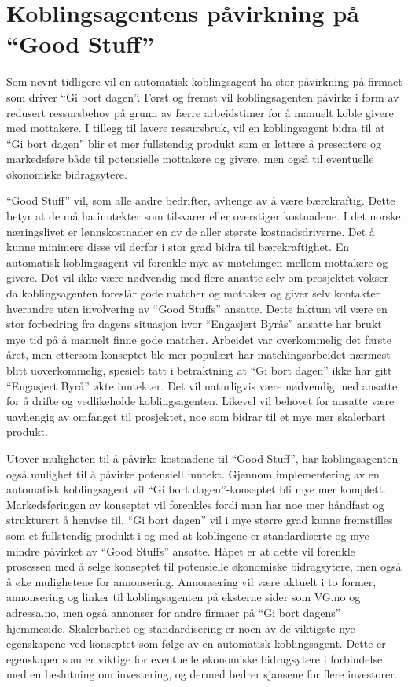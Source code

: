 \section{Koblingsagentens påvirkning på ``Good Stuff''}
\label{sec:koblingsagent}
Som nevnt tidligere vil en automatisk koblingsagent ha stor påvirkning på firmaet som driver ``Gi bort dagen''. Først og fremst vil koblingsagenten påvirke i form av redusert ressursbehov på grunn av færre arbeidstimer for å manuelt koble givere med mottakere. I tillegg til lavere ressursbruk, vil en koblingsagent bidra til at ``Gi bort dagen'' blir et mer fullstendig produkt som er lettere å presentere og markedsføre både til potensielle mottakere og givere, men også til eventuelle økonomiske bidragsytere.

``Good Stuff'' vil, som alle andre bedrifter, avhenge av å være bærekraftig. Dette betyr at de må ha inntekter som tilsvarer eller overstiger kostnadene. I det norske næringslivet er lønnskostnader en av de aller største kostnadsdriverne. Det å kunne minimere disse vil derfor i stor grad bidra til bærekraftighet. En automatisk koblingsagent vil forenkle mye av matchingen mellom mottakere og givere. Det vil ikke være nødvendig med flere ansatte selv om prosjektet vokser da koblingsagenten foreslår gode matcher og mottaker og giver selv kontakter hverandre uten involvering av ``Good Stuffs'' ansatte. Dette faktum vil være en stor forbedring fra dagens situasjon hvor ``Engasjert Byrås'' ansatte har brukt mye tid på å manuelt finne gode matcher. Arbeidet var overkommelig det første året, men ettersom konseptet ble mer populært har matchingsarbeidet nærmest blitt uoverkommelig, spesielt tatt i betraktning at ``Gi bort dagen'' ikke har gitt ``Engasjert Byrå'' økte inntekter. Det vil naturligvis være nødvendig med ansatte for å drifte og vedlikeholde koblingsagenten. Likevel vil behovet for ansatte være uavhengig av omfanget til prosjektet, noe som bidrar til et mye mer skalerbart produkt.

Utover muligheten til å påvirke kostnadene til ``Good Stuff'', har koblingsagenten også mulighet til å påvirke potensiell inntekt. Gjennom implementering av en automatisk koblingsagent vil “Gi bort dagen”-konseptet bli mye mer komplett. Markedsføringen av konseptet vil forenkles fordi man har noe mer håndfast og strukturert å henvise til. ``Gi bort dagen'' vil i mye større grad kunne fremstilles som et fullstendig produkt i og med at koblingene er standardiserte og mye mindre påvirket av ``Good Stuffs'' ansatte. Håpet er at dette vil forenkle prosessen med å selge konseptet til potensielle økonomiske bidragsytere, men også å øke mulighetene for annonsering. Annonsering vil være aktuelt i to former, annonsering og linker til koblingsagenten på eksterne sider som VG.no og adressa.no, men også annonser for andre firmaer på ``Gi bort dagens'' hjemmeside. Skalerbarhet og standardisering er noen av de viktigste nye egenskapene ved konseptet som følge av en automatisk koblingsagent. Dette er egenskaper som er viktige for eventuelle økonomiske bidragsytere i forbindelse med en beslutning om investering, og dermed bedrer sjansene for flere investorer.


